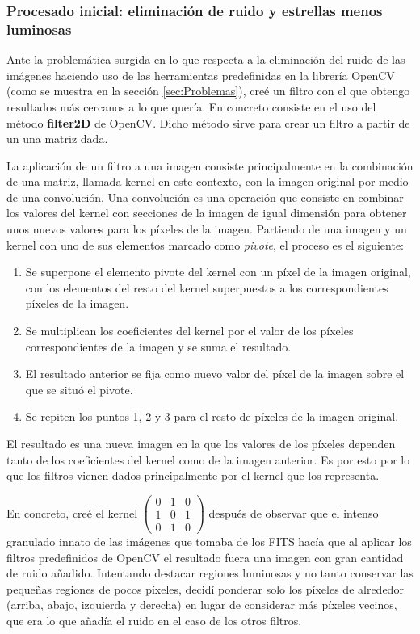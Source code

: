 \documentclass[a4paper,12pt]{article}
\begin{document}
\subsubsection{Procesado inicial: eliminación de ruido y estrellas menos luminosas}

Ante la problemática surgida en lo que respecta a la eliminación del ruido de las imágenes haciendo uso de las herramientas predefinidas en la librería OpenCV (como se muestra en la sección \ref{sec:Problemas}), creé un filtro con el que obtengo resultados más cercanos a lo que quería. En concreto consiste en el uso del método \textbf{filter2D}\cite{filter2d} de OpenCV. Dicho método sirve para crear un filtro a partir de un una matriz dada.

La aplicación de un filtro a una imagen consiste principalmente en la combinación de una matriz, llamada kernel en este contexto, con la imagen original por medio de una convolución. Una convolución es una operación que consiste en combinar los valores del kernel con secciones de la imagen de igual dimensión para obtener unos nuevos valores para los píxeles de la imagen. Partiendo de una imagen y un kernel con uno de sus elementos marcado como \textit{pivote}, el proceso es el siguiente:

\begin{enumerate}
\item Se superpone el elemento pivote del kernel con un píxel de la imagen original, con los elementos del resto del kernel superpuestos a los correspondientes píxeles de la imagen.
\item Se multiplican los coeficientes del kernel por el valor de los píxeles correspondientes de la imagen y se suma el resultado.
\item El resultado anterior se fija como nuevo valor del píxel de la imagen sobre el que se situó el pivote.
\item Se repiten los puntos 1, 2 y 3 para el resto de píxeles de la imagen original.
\end{enumerate}

El resultado es una nueva imagen en la que los valores de los píxeles dependen tanto de los coeficientes del kernel como de la imagen anterior. Es por esto por lo que los filtros vienen dados principalmente por el kernel que los representa.

En concreto, creé el kernel
$\begin{pmatrix}
0 & 1 & 0 \\
1 & 0 & 1 \\
0 & 1 & 0
\end{pmatrix}$
después de observar que el intenso granulado innato de las imágenes que tomaba de los FITS hacía que al aplicar los filtros predefinidos de OpenCV el resultado fuera una imagen con gran cantidad de ruido añadido. Intentando destacar regiones luminosas y no tanto conservar las pequeñas regiones de pocos píxeles, decidí ponderar solo los píxeles de alrededor (arriba, abajo, izquierda y derecha) en lugar de considerar más píxeles vecinos, que era lo que añadía el ruido en el caso de los otros filtros.
\end{document}
